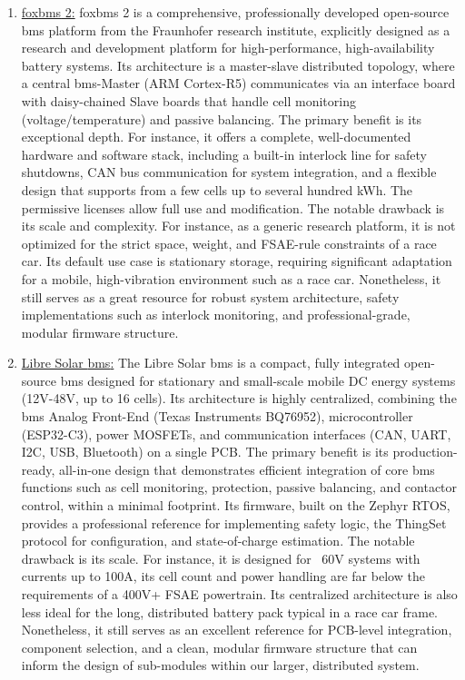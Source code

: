 \begin{enumerate}
	\item \href{https://docs.fox\gls{bms}.org/}{fox\gls{bms} 2:} fox\gls{bms} 2 is a comprehensive, professionally developed open-source \gls{bms} platform from the Fraunhofer research institute, explicitly designed as a research and development platform for high-performance, high-availability battery systems. Its architecture is a master-slave distributed topology, where a central \gls{bms}-Master (ARM Cortex-R5) communicates via an interface board with daisy-chained Slave boards that handle cell monitoring (voltage/temperature) and passive balancing. The primary benefit is its exceptional depth. For instance, it offers a complete, well-documented hardware and software stack, including a built-in interlock line for safety shutdowns, CAN bus communication for system integration, and a flexible design that supports from a few cells up to several hundred kWh. The permissive licenses allow full use and modification. The notable drawback is its scale and complexity. For instance, as a generic research platform, it is not optimized for the strict space, weight, and FSAE-rule constraints of a race car. Its default use case is stationary storage, requiring significant adaptation for a mobile, high-vibration environment such as a race car. Nonetheless, it still serves as a great resource for robust system architecture, safety implementations such as interlock monitoring, and professional-grade, modular firmware structure.
	
	\item \href{https://libre.solar/\gls{bms}-c1/manual/}{Libre Solar \gls{bms}:} The Libre Solar \gls{bms} is a compact, fully integrated open-source \gls{bms} designed for stationary and small-scale mobile DC energy systems (12V-48V, up to 16 cells). Its architecture is highly centralized, combining the \gls{bms} Analog Front-End (Texas Instruments BQ76952), microcontroller (ESP32-C3), power MOSFETs, and communication interfaces (CAN, UART, I2C, USB, Bluetooth) on a single PCB. The primary benefit is its production-ready, all-in-one design that demonstrates efficient integration of core \gls{bms} functions such as cell monitoring, protection, passive balancing, and contactor control, within a minimal footprint. Its firmware, built on the Zephyr RTOS, provides a professional reference for implementing safety logic, the ThingSet protocol for configuration, and state-of-charge estimation. The notable drawback is its scale. For instance, it is designed for ~60V systems with currents up to 100A, its cell count and power handling are far below the requirements of a 400V+ FSAE powertrain. Its centralized architecture is also less ideal for the long, distributed battery pack typical in a race car frame. Nonetheless, it still serves as an excellent reference for PCB-level integration, component selection, and a clean, modular firmware structure that can inform the design of sub-modules within our larger, distributed system.
	

\end{enumerate}
